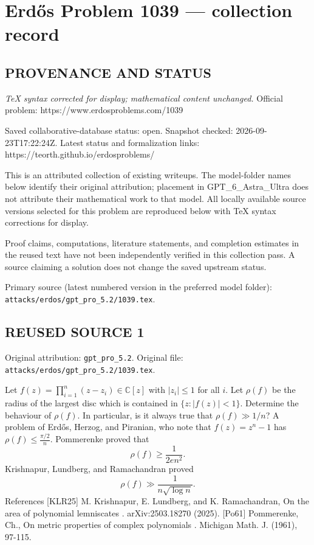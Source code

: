 \section*{Erd\H{o}s Problem 1039 --- collection record}

\subsection*{PROVENANCE AND STATUS}

\emph{TeX syntax corrected for display; mathematical content unchanged.}
Official problem: https://www.erdosproblems.com/1039

Saved collaborative-database status: open.
Snapshot checked: 2026-09-23T17:22:24Z.
Latest status and formalization links: https://teorth.github.io/erdosproblems/

This is an attributed collection of existing writeups. The model-folder names below identify their original attribution; placement in GPT\_6\_Astra\_Ultra does not attribute their mathematical work to that model. All locally available source versions selected for this problem are reproduced below with TeX syntax corrections for display.

Proof claims, computations, literature statements, and completion estimates in the reused text have not been independently verified in this collection pass. A source claiming a solution does not change the saved upstream status.

Primary source (latest numbered version in the preferred model folder): \texttt{attacks/erdos/gpt\_pro\_5.2/1039.tex}.

\subsection*{REUSED SOURCE 1}
Original attribution: \texttt{gpt\_pro\_5.2}.
Original file: \texttt{attacks/erdos/gpt\_pro\_5.2/1039.tex}.


Let $f(z)=\prod_{i=1}^n(z-z_i)\in \mathbb{C}[z]$ with $\lvert z_i\rvert \leq 1$ for all $i$. Let $\rho(f)$ be the radius of the largest disc which is contained in $\{z: \lvert f(z)\rvert< 1\}$. Determine the behaviour of $\rho(f)$. In particular, is it always true that $\rho(f)\gg 1/n$? A problem of Erd\H{o}s, Herzog, and Piranian, who note that $f(z)=z^n-1$ has $\rho(f) \leq \frac{\pi/2}{n}$. Pommerenke \cite{Po61} proved that\[\rho(f) \geq \frac{1}{2en^2}.\]Krishnapur, Lundberg, and Ramachandran \cite{KLR25} proved\[\rho(f) \gg \frac{1}{n\sqrt{\log n}}.\] References [KLR25] M. Krishnapur, E. Lundberg, and K. Ramachandran, On the area of polynomial lemniscates . arXiv:2503.18270 (2025). [Po61] Pommerenke, Ch., On metric properties of complex polynomials . Michigan Math. J. (1961), 97-115.



